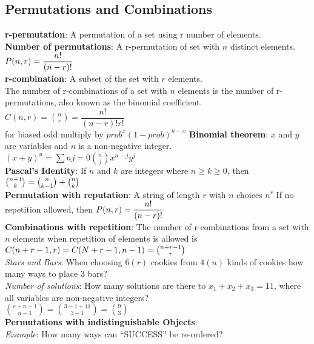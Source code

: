 \documentclass[letter]{article}
\begin{document}
\begin{multicols}{2}
  \subsection{Permutations and Combinations} 
  \textbf{r-permutation}: A permutation of a set using r number of
  elements. \\
  \textbf{Number of permutations}: A r-permutation of set with $n$ distinct
  elements.
  $\\P(n, r) = \dfrac{n!}{(n - r)!}$\\
  \textbf{r-combination}: A subset of the set with $r$ elements. \\
  The number of r-combinations of a set with $n$ elements is the number of
  r-permutations, also known as the binomial coefficient.\\
  $C(n, r) = \binom{n}{r} = \dfrac{n!}{(n - r)!r!}$\\
  for biased odd multiply by ${prob}^x{(1-prob)}^{n-x}$
  \textbf{Binomial theorem}: $x$ and $y$ are variables and $n$ is a
  non-negative integer. \\
  ${(x + y)}^{n} = \sum{n}{j = 0}\binom{n}{j}x^{n - j}y^{j}$\\
  \textbf{Pascal's Identity}: If $n$ and $k$ are integers where
  $n \geq k \geq 0$, then
  $\\\binom{n + 1}{k}=\binom{n}{k - 1}+\binom{n}{k}$\\
  \textbf{Permutation with reputation}: A string of length $r$ with $n$
  choices $n^r$ If no repetition allowed, then
  $\\P(n, r) = \dfrac{n!}{(n - r)!}$\\
  \textbf{Combinations with repetition}: The number of r-combinations from a
  set with $n$ elements when repetition of elements is allowed is
  $\\C(n + r - 1, r)=C(N + r - 1, n - 1) = \binom{n + r - 1}{r}$\\
  \textit{Stars and Bars}: When choosing $6(r)$ cookies from $4(n)$ kinds of
  cookies how many ways to place 3 bars? \\
  \textit{Number of solutions}: How many solutions are there to
  $x_1 + x_2 + x_3 = 11$, where all variables are non-negative integers? \\
  $\binom{r + n - 1}{n - 1} = \binom{3 - 1 + 11}{3 - 1} = \binom{9}{3}$\\
  \textbf{Permutations with indistinguishable Objects}: \\
  \textit{Example}: How many ways can ``SUCCESS'' be re-ordered? \\

\end{multicols}
\end{document}
